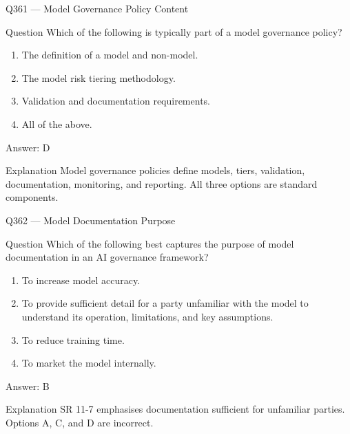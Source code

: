 \documentclass[aspectratio=169,8pt]{beamer}
\begin{document}
	\begin{frame}{Q361 --- Model Governance Policy Content}
		\begin{block}{Question}
			Which of the following is typically part of a model governance policy?
			\begin{enumerate}
				\item The definition of a model and non-model.
				\item The model risk tiering methodology.
				\item Validation and documentation requirements.
				\item All of the above.
			\end{enumerate}
		\end{block}
		\begin{exampleblock}{Answer: D}\end{exampleblock}
		\begin{block}{Explanation}
			Model governance policies define models, tiers, validation, documentation, monitoring, and reporting. All three options are standard components.
		\end{block}
	\end{frame}
	
	\begin{frame}{Q362 --- Model Documentation Purpose}
		\begin{block}{Question}
			Which of the following best captures the purpose of model documentation in an AI governance framework?
			\begin{enumerate}
				\item To increase model accuracy.
				\item To provide sufficient detail for a party unfamiliar with the model to understand its operation, limitations, and key assumptions.
				\item To reduce training time.
				\item To market the model internally.
			\end{enumerate}
		\end{block}
		\begin{exampleblock}{Answer: B}\end{exampleblock}
		\begin{block}{Explanation}
			SR 11-7 emphasises documentation sufficient for unfamiliar parties. Options A, C, and D are incorrect.
		\end{block}
	\end{frame}
	
\end{document}
